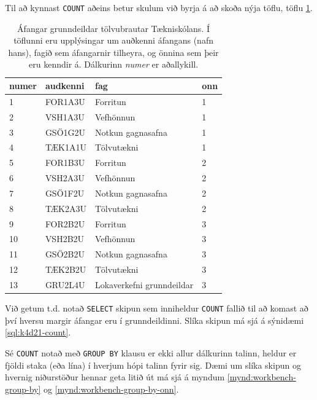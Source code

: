Til að kynnast \verb|COUNT| aðeins betur skulum við byrja á að skoða nýja töflu, töflu \ref{tafla:afangar}.

\begin{table}
\centering
\caption[Áfangar]{Áfangar grunndeildar tölvubrautar Tækniskólans. Í töflunni eru upplýsingar um auðkenni áfangans (nafn hans), fagið sem áfangarnir tilheyra, og önnina sem þeir eru kenndir á. Dálkurinn \emph{numer} er aðallykill.}
\label{tafla:afangar}
\begin{tabular}{llll}
\toprule
numer&audkenni&fag&onn\\
\midrule
1&	FOR1A3U&	Forritun&		1\\
2&	VSH1A3U&	Vefhönnun&		1\\
3&	GSÖ1G2U&	Notkun gagnasafna&	1\\
4&	TÆK1A1U&	Tölvutækni&		1\\
5&	FOR1B3U&	Forritun&		2\\
6&	VSH2A3U&	Vefhönnun&		2\\
7&	GSÖ1F2U&	Notkun gagnasafna&	2\\
8&	TÆK2A3U&	Tölvutækni&		2\\
9&	FOR2B2U&	Forritun&		3\\
10&	VSH2B2U&	Vefhönnun&		3\\
11&	GSÖ2B2U&	Notkun gagnasafna&	3\\
12&	TÆK2B2U&	Tölvutækni&		3\\
13&	GRU2L4U&	Lokaverkefni grunndeildar&3\\
\bottomrule
\end{tabular}
\end{table}

Við getum t.d. notað \verb|SELECT| skipun sem inniheldur \verb|COUNT| fallið til að komast að því hversu margir áfangar eru í grunndeildinni. Slíka skipun má sjá á sýnidæmi \ref{sql:k4d21-count}.

\begin{example}
\caption[COUNT á dálk]{\emph{SELECT} skipun sem finnur fjölda lína í \emph{Afangar} töflunni (töluna 13). Í raun er fjöldi gilda í dálkinum \emph{numer} talinn, en þar sem við vitum að \emph{numer} er aðallykill getum við verið viss um að allar línurnar séu taldar.}
\label{sql:k4d21-count}
\centering
{}
\end{example}

Sé \verb|COUNT| notað með \verb|GROUP BY| klausu er ekki allur dálkurinn talinn, heldur er fjöldi staka (eða lína) í hverjum hópi talinn fyrir sig. Dæmi um slíka skipun og hvernig niðurstöður hennar geta litið út má sjá á myndum \ref{mynd:workbench-group-by} og \ref{mynd:workbench-group-by-onn}.

